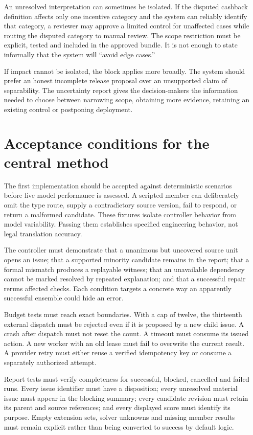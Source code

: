 \documentclass[12pt,a4paper,oneside,openany]{book}
\begin{document}
An unresolved interpretation can sometimes be isolated. If the disputed cashback
definition affects only one incentive category and the system can reliably
identify that category, a reviewer may approve a limited control for unaffected
cases while routing the disputed category to manual review. The scope restriction
must be explicit, tested and included in the approved bundle. It is not enough to
state informally that the system will ``avoid edge cases.''

If impact cannot be isolated, the block applies more broadly. The system should
prefer an honest incomplete release proposal over an unsupported claim of
separability. The uncertainty report gives the decision-makers the information
needed to choose between narrowing scope, obtaining more evidence, retaining an
existing control or postponing deployment.

\section{Acceptance conditions for the central method}

The first implementation should be accepted against deterministic scenarios
before live model performance is assessed. A scripted member can deliberately
omit the type route, supply a contradictory source version, fail to respond, or
return a malformed candidate. These fixtures isolate controller behavior from
model variability. Passing them establishes specified engineering behavior, not
legal translation accuracy.

The controller must demonstrate that a unanimous but uncovered source unit opens
an issue; that a supported minority candidate remains in the report; that a
formal mismatch produces a replayable witness; that an unavailable dependency
cannot be marked resolved by repeated explanation; and that a successful repair
reruns affected checks. Each condition targets a concrete way an apparently
successful ensemble could hide an error.

Budget tests must reach exact boundaries. With a cap of twelve, the thirteenth
external dispatch must be rejected even if it is proposed by a new child issue.
A crash after dispatch must not reset the count. A timeout must consume its
issued action. A new worker with an old lease must fail to overwrite the current
result. A provider retry must either reuse a verified idempotency key or consume
a separately authorized attempt.

Report tests must verify completeness for successful, blocked, cancelled and
failed runs. Every issue identifier must have a disposition; every unresolved
material issue must appear in the blocking summary; every candidate revision
must retain its parent and source references; and every displayed score must
identify its purpose. Empty extension sets, solver unknowns and missing member
results must remain explicit rather than being converted to success by default
logic.
\end{document}
